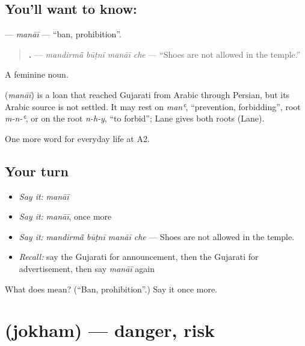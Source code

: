 \subsection*{You'll want to know: }
\textbf{} — \emph{manāī} — \textquotedblleft{}ban, prohibition\textquotedblright{}.

\begin{quote}
\textbf{   .} — \emph{mandirmā̃ būṭnī manāī che} — \textquotedblleft{}Shoes are not allowed in the temple.\textquotedblright{}
\end{quote}

A feminine noun.

\begin{cousinweb}
\textbf{} (\emph{manāī}) is a loan that reached Gujarati from Arabic through Persian, but its Arabic source is not settled. It may rest on \emph{manʿ}, \textquotedblleft{}prevention, forbidding\textquotedblright{}, root \emph{m-n-ʿ}, or on the root \emph{n-h-y}, \textquotedblleft{}to forbid\textquotedblright{}; Lane gives both roots (Lane).
\end{cousinweb}

\begin{grammarlens}[title={What you've built}]
One more word for everyday life at A2.
\end{grammarlens}

\subsection*{Your turn}
\begin{itemize}
\raggedright
  \item \emph{Say it:} \emph{manāī}
  \item \emph{Say it:} \emph{manāī}, once more
  \item \emph{Say it:} \emph{mandirmā̃ būṭnī manāī che} — Shoes are not allowed in the temple.
  \item \emph{Recall:} say the Gujarati for announcement, then the Gujarati for advertisement, then say \emph{manāī} again
\end{itemize}

\begin{tcolorbox}[breakable,colback=teal!4,colframe=teal!35!black,title={Before you move on}]
What does  mean? (\textquotedblleft{}Ban, prohibition\textquotedblright{}.) Say it once more.
\end{tcolorbox}
\section[\texorpdfstring{\gu{જોખમ} (jokham)}{જોખમ (jokham)}]{ (jokham) — danger, risk}

